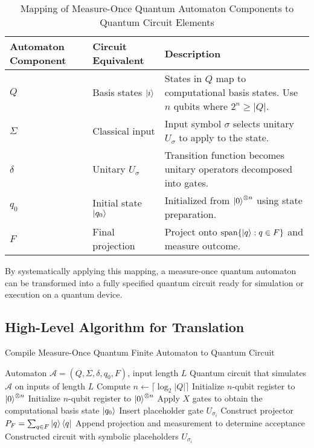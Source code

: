 \medskip

\begin{table}[h]
    \centering
    \begin{tabularx}{\textwidth}{|l|l|X|}
    \hline
    \textbf{Automaton Component} & \textbf{Circuit Equivalent} & \textbf{Description} \\
    \hline
    $Q$ & Basis states $\ket{i}$ & States in $Q$ map to computational basis states. Use $n$ qubits where $2^n \geq |Q|$. \\
    \hline
    $\Sigma$ & Classical input & Input symbol $\sigma$ selects unitary $U_\sigma$ to apply to the state. \\
    \hline
    $\delta$ & Unitary $U_\sigma$ & Transition function becomes unitary operators decomposed into gates. \\
    \hline
    $q_0$ & Initial state $\ket{q_0}$ & Initialized from $\ket{0}^{\otimes n}$ using state preparation. \\
    \hline
    $F$ & Final projection & Project onto $\text{span}\{\ket{q} : q \in F\}$ and measure outcome. \\
    \hline
    \end{tabularx}
    \label{tab:automaton-to-circuit}
    \caption{Mapping of Measure-Once Quantum Automaton Components to Quantum Circuit Elements}
\end{table}

By systematically applying this mapping, a measure-once quantum automaton can be transformed into a fully specified quantum circuit ready for simulation or execution on a quantum device.

\subsection{High-Level Algorithm for Translation}
\begin{algorithm}[H]
    \caption{Compile Measure-Once Quantum Finite Automaton to Quantum Circuit}
    \label{alg:compile-mo-qfa}
    \begin{algorithmic}[1]
    \Require Automaton $\mathcal{A} = (Q, \Sigma, \delta, q_0, F)$, input length $L$
    \Ensure Quantum circuit that simulates $\mathcal{A}$ on inputs of length $L$
    \State Compute $n \gets \lceil \log_2 |Q| \rceil$
    \State Initialize $n$-qubit register to $\ket{0}^{\otimes n}$
    \State Initialize $n$-qubit register to $\ket{0}^{\otimes n}$
    \State Apply $X$ gates to obtain the computational basis state $\ket{q_0}$
        \State Insert placeholder gate $U_{\sigma_i}$
    \EndFor
    \State Construct projector $P_F = \sum_{q \in F} \ket{q}\bra{q}$
    \State Append projection and measurement to determine acceptance
    \State \Return Constructed circuit with symbolic placeholders $U_{\sigma_i}$
    \end{algorithmic}
\end{algorithm}


